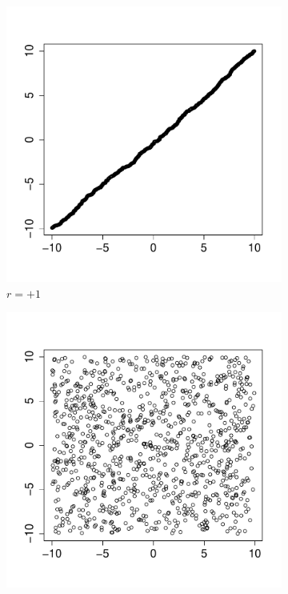 \begin{figure}[h!]
\centering
\begin{subfigure}[b]{0.3\textwidth}
\includegraphics{begriffe-015}
\caption{$r=+1$}
\end{subfigure}
\begin{subfigure}[b]{0.3\textwidth}
\includegraphics{begriffe-016}

\end{subfigure}
\end{figure}
